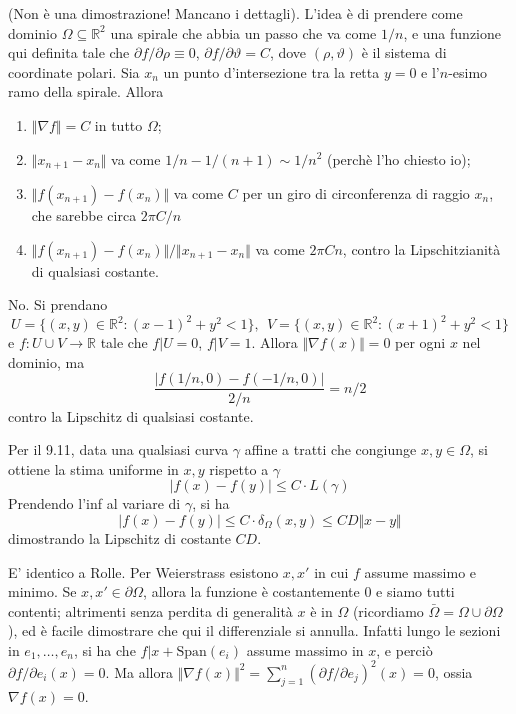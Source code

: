  (Non è una dimostrazione! Mancano i dettagli). L'idea è di prendere come dominio $\Omega \subseteq \mathbb{R}^2 $ una spirale che abbia un passo che va come $1/n$, e una funzione qui definita tale che $\partial f / \partial \rho \equiv 0 $, $\partial f / \partial \vartheta = C$, dove $(\rho, \vartheta)$ è il sistema di coordinate polari. Sia $x_n$ un punto d'intersezione tra la retta $y=0$ e l'$n$-esimo ramo della spirale. Allora
\begin{enumerate}
\item $\Vert \nabla f \Vert = C$ in tutto $\Omega$;
\item $\Vert x_{n+1} - x_n \Vert $ va come $1/n - 1/(n+1) \sim 1/n^2$ (perchè l'ho chiesto io);
\item $\Vert f(x_{n+1} ) - f(x_n) \Vert$ va come $C$ per un giro di circonferenza di raggio $x_n$, che sarebbe circa $2 \pi C / n$
\item $\Vert f(x_{n+1} ) - f(x_n) \Vert / \Vert x_{n+1} - x_n \Vert $ va come $2 \pi C n$, contro la Lipschitzianità di qualsiasi costante.
\end{enumerate}

 No. Si prendano
$$ U = \{ (x,y) \in \mathbb{R}^2 : (x-1)^2 + y^2 < 1\},\ \ V = \{ (x,y) \in \mathbb{R}^2: (x+1)^2 + y^2 < 1 \} $$
e $f: U \cup V \to \mathbb{R}$ tale che $f|U = 0$, $f|V = 1$. Allora $\Vert \nabla f(x) \Vert = 0$ per ogni $x$ nel dominio, ma
$$ \frac{ |f(1/n,0) - f(-1/n,0) | }{ 2/n } = n/2 $$
contro la Lipschitz di qualsiasi costante. 

 Per il 9.11, data una qualsiasi curva $\gamma$ affine a tratti che congiunge $x,y \in \Omega$, si ottiene la stima uniforme in $x,y$ rispetto a $\gamma$ 
$$ \vert f(x) - f(y) \vert \le C \cdot L(\gamma) $$
Prendendo l'inf al variare di $\gamma$, si ha
$$ \vert f(x) - f(y) \vert \le C \cdot \delta_{\Omega}(x,y) \le CD \Vert x-y \Vert $$
dimostrando la Lipschitz di costante $CD$.  

 E' identico a Rolle. Per Weierstrass esistono $x, x'$ in cui $f$ assume massimo e minimo. Se $x,x' \in \partial \Omega$, allora la funzione è costantemente 0 e siamo tutti contenti; altrimenti senza perdita di generalità $x$ è in $\Omega$ (ricordiamo $\bar{\Omega} = \Omega \cup \partial \Omega $ ), ed è facile dimostrare che qui il differenziale si annulla. Infatti lungo le sezioni in $e_1, \ldots, e_n$, si ha che $f | x+\mathrm {Span} (e_i) $ assume massimo in $x$, e perciò $\partial f / \partial e_i (x) = 0$. Ma allora $\Vert \nabla f(x) \Vert^2 =  \sum_{j=1}^n (\partial f / \partial e_j ) ^2 (x)  = 0$, ossia $\nabla f(x) = 0$. 

